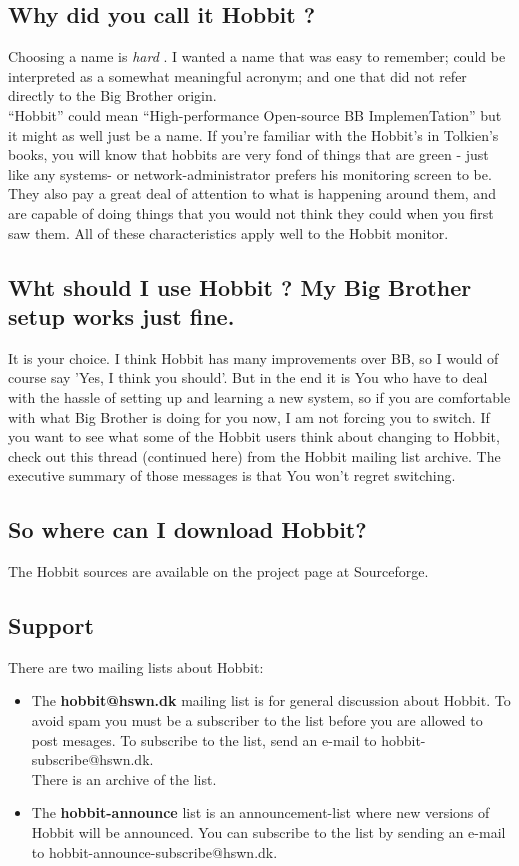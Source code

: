 \subsection{Why did you call it Hobbit ?}


 Choosing a name is \emph{hard}
. I wanted a name that was easy to remember; could be interpreted as a somewhat meaningful acronym; and one that did not refer directly to the Big Brother origin.\\ 
 ``Hobbit'' could mean ``High-performance Open-source BB ImplemenTation'' but it might as well just be a name. If you're familiar with the Hobbit's in Tolkien's books, you will know that hobbits are very fond of things that are green - just like any systems- or network-administrator prefers his monitoring screen to be. They also pay a great deal of attention to what is happening around them, and are capable of doing things that you would not think they could when you first saw them. All of these characteristics apply well to the Hobbit monitor. 
\subsection{Wht should I use Hobbit ? My Big Brother setup works just fine.}


 It is your choice. I think Hobbit has many improvements over BB, so I would of course say 'Yes, I think you should'. But in the end it is You who have to deal with the hassle of setting up and learning a new system, so if you are comfortable with what Big Brother is doing for you now, I am not forcing you to switch. If you want to see what some of the Hobbit users think about changing to Hobbit, check out this thread (continued here) from the Hobbit mailing list archive. The executive summary of those messages is that You won't regret switching.
\subsection{So where can I download Hobbit?}


 The Hobbit sources are available on the project page at Sourceforge.
\subsection{Support}


 There are two mailing lists about Hobbit: \begin{itemize}
\item The \textbf{hobbit@hswn.dk}
 mailing list is for general discussion about Hobbit. To avoid spam you must be a subscriber to the list before you are allowed to post mesages. To subscribe to the list, send an e-mail to hobbit-subscribe@hswn.dk.\\ 
 There is an archive of the list.
\item The \textbf{hobbit-announce}
 list is an announcement-list where new versions of Hobbit will be announced. You can subscribe to the list by sending an e-mail to hobbit-announce-subscribe@hswn.dk.

\end{itemize}



